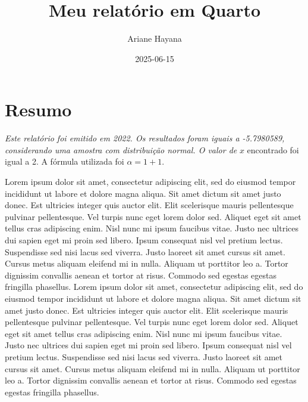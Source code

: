 \documentclass[
  a4paper,
]{report}
\title{Meu relatório em Quarto}
\author{Ariane Hayana}
\date{2025-06-15}
\renewcommand*\contentsname{Índice}
\newcommand\contentsname{Índice}
\begin{document}
\maketitle
\ifdefined\Shaded\renewenvironment{Shaded}{\begin{tcolorbox}[interior hidden, sharp corners, breakable, enhanced, borderline west={3pt}{0pt}{shadecolor}, frame hidden, boxrule=0pt]}{\end{tcolorbox}}\fi

\renewcommand*\contentsname{Índice}
{
\hypersetup{linkcolor=}
\setcounter{tocdepth}{2}
\tableofcontents
}
\listoffigures
\listoftables
\hypertarget{resumo}{%
\chapter*{Resumo}\label{resumo}}

\emph{Este relatório foi emitido em 2022. Os resultados foram iguais a
-5.7980589, considerando uma amostra com distribuição normal. O valor
de} \(x\) encontrado foi igual a 2. A fórmula utilizada foi
\(\alpha = 1+1\).

Lorem ipsum dolor sit amet, consectetur adipiscing elit, sed do eiusmod
tempor incididunt ut labore et dolore magna aliqua. Sit amet dictum sit
amet justo donec. Est ultricies integer quis auctor elit. Elit
scelerisque mauris pellentesque pulvinar pellentesque. Vel turpis nunc
eget lorem dolor sed. Aliquet eget sit amet tellus cras adipiscing enim.
Nisl nunc mi ipsum faucibus vitae. Justo nec ultrices dui sapien eget mi
proin sed libero. Ipsum consequat nisl vel pretium lectus. Suspendisse
sed nisi lacus sed viverra. Justo laoreet sit amet cursus sit amet.
Cursus metus aliquam eleifend mi in nulla. Aliquam ut porttitor leo a.
Tortor dignissim convallis aenean et tortor at risus. Commodo sed
egestas egestas fringilla phasellus. Lorem ipsum dolor sit amet,
consectetur adipiscing elit, sed do eiusmod tempor incididunt ut labore
et dolore magna aliqua. Sit amet dictum sit amet justo donec. Est
ultricies integer quis auctor elit. Elit scelerisque mauris pellentesque
pulvinar pellentesque. Vel turpis nunc eget lorem dolor sed. Aliquet
eget sit amet tellus cras adipiscing enim. Nisl nunc mi ipsum faucibus
vitae. Justo nec ultrices dui sapien eget mi proin sed libero. Ipsum
consequat nisl vel pretium lectus. Suspendisse sed nisi lacus sed
viverra. Justo laoreet sit amet cursus sit amet. Cursus metus aliquam
eleifend mi in nulla. Aliquam ut porttitor leo a. Tortor dignissim
convallis aenean et tortor at risus. Commodo sed egestas egestas
fringilla phasellus.
\end{document}
